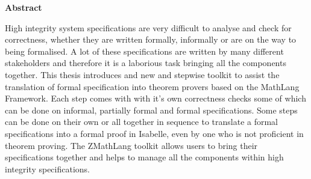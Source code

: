 \begin{center}
\LARGE\textbf {Abstract}
\end{center}
\vspace{1cm}

\begin{spacing}{1} 
\noindent
High integrity system specifications are very difficult to analyse and check for
correctness, whether they are written formally, informally or are on the way to
being formalised. A lot of these specifications are written by many different
stakeholders and therefore it is a laborious task bringing all the components
together. This thesis introduces and new and stepwise toolkit to assist the
translation of formal specification into theorem provers based on the MathLang Framework. Each step comes with
with it's own correctness checks some of which can be done on informal,
partially formal and formal specifications. Some steps can be done on their own
or all together in sequence to translate a formal specifications into a formal
proof in Isabelle, even by one who is not proficient in theorem proving. The
ZMathLang toolkit allows users to bring their specifications together and helps
to manage all the components within high integrity specifications.

\end{spacing}